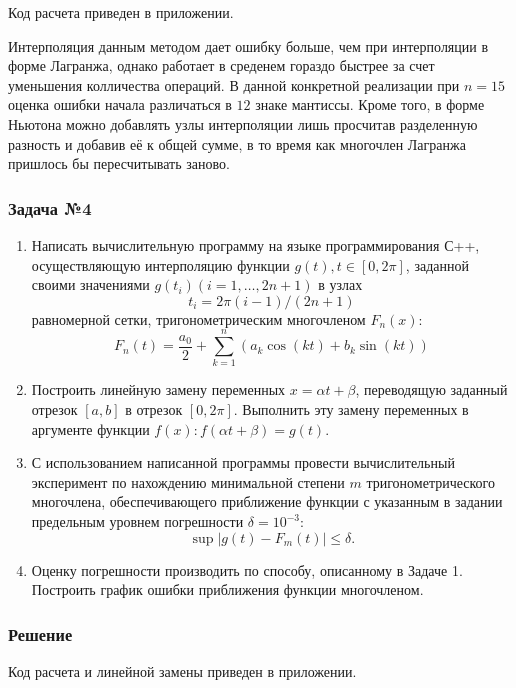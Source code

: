 \documentclass[a4paper, fontsize=14pt]{article}
\begin{document}
    Код расчета приведен в приложении.

    Интерполяция данным методом дает ошибку больше, чем при интерполяции в форме Лагранжа, однако работает в среденем гораздо быстрее за счет уменьшения колличества операций.
    В данной конкретной реализации при $n=15$ оценка ошибки начала различаться в $12$ знаке мантиссы. 
    Кроме того, в форме Ньютона можно добавлять узлы интерполяции лишь просчитав разделенную разность и добавив её к общей сумме, в то время как многочлен Лагранжа пришлось бы пересчитывать заново.

    \subsubsection*{Задача №4}
    \begin{enumerate}
        \item Написать вычислительную программу на языке программирования С++, осуществляющую интерполяцию функции $g(t), t\in[0,2\pi]$, заданной своими значениями $g(t_i) (i=1,\dots,2n+1)$ в узлах $$t_i=2 \pi (i-1)/(2n+1)$$ равномерной сетки, тригонометрическим многочленом $F_n(x)$:
        \begin{equation*}
            F_n(t)=\frac{a_0}{2}+\sum_{k=1}^{n} \left( a_k  \cos(kt)+b_k \sin(kt) \right)
        \end{equation*}
        \item Построить линейную замену переменных $x=\alpha t+ \beta$, переводящую заданный отрезок $[a,b]$ в отрезок $[0,2\pi]$. Выполнить эту замену переменных в аргументе функции $f(x): f(\alpha t+\beta) = g(t)$.
        \item С использованием написанной программы провести вычислительный эксперимент по нахождению минимальной степени $m$ тригонометрического многочлена, обеспечивающего приближение функции с указанным в задании предельным уровнем погрешности $\delta = 10^{-3}$:
        \begin{equation*}
            \operatorname{sup} |g(t)-F_m (t)| \leq \delta.
        \end{equation*}
        \item Оценку погрешности производить по способу, описанному в Задаче 1. Построить график ошибки приближения функции многочленом.
    \end{enumerate}
    
    \subsubsection*{Решение}
    Код расчета и линейной замены приведен в приложении.
\end{document}
